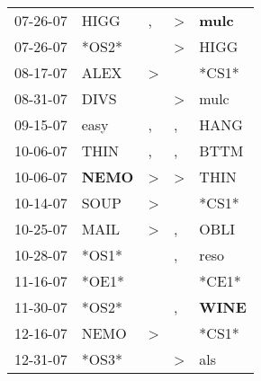 \begin{supertabular}{p{0.07\textwidth}p{0.06\textwidth}p{0.02\textwidth}p{0.02\textwidth}p{0.06\textwidth}}
          07-26-07\textsuperscript{} &           HIGG\textsuperscript{} &                , &     \textgreater &  \textbf{mulc\textsuperscript{}} \\
          07-26-07\textsuperscript{} &                            *OS2* &                  &     \textgreater &           HIGG\textsuperscript{} \\
          08-17-07\textsuperscript{} &           ALEX\textsuperscript{} &     \textgreater &                  &                            *CS1* \\
          08-31-07\textsuperscript{} &           DIVS\textsuperscript{} &                  &     \textgreater &           mulc\textsuperscript{} \\
          09-15-07\textsuperscript{} &           easy\textsuperscript{} &                , &                , &           HANG\textsuperscript{} \\
          10-06-07\textsuperscript{} &           THIN\textsuperscript{} &                , &                , &           BTTM\textsuperscript{} \\
          10-06-07\textsuperscript{} &  \textbf{NEMO\textsuperscript{}} &     \textgreater &     \textgreater &           THIN\textsuperscript{} \\
          10-14-07\textsuperscript{} &           SOUP\textsuperscript{} &     \textgreater &                  &                            *CS1* \\
          10-25-07\textsuperscript{} &           MAIL\textsuperscript{} &     \textgreater &                , &           OBLI\textsuperscript{} \\
          10-28-07\textsuperscript{} &                            *OS1* &                  &                , &           reso\textsuperscript{} \\
          11-16-07\textsuperscript{} &                            *OE1* &                  &                  &                            *CE1* \\
          11-30-07\textsuperscript{} &                            *OS2* &                  &                , &  \textbf{WINE\textsuperscript{}} \\
          12-16-07\textsuperscript{} &           NEMO\textsuperscript{} &     \textgreater &                  &                            *CS1* \\
          12-31-07\textsuperscript{} &                            *OS3* &                  &     \textgreater &            als\textsuperscript{} \\

\end{supertabular}
